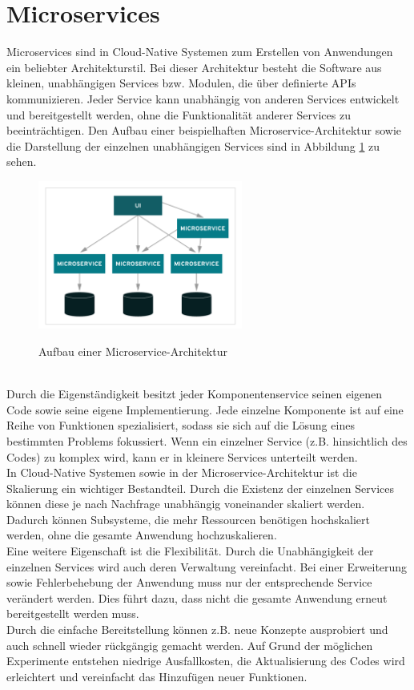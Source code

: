 \section{Microservices}
Microservices sind in Cloud-Native Systemen zum Erstellen von Anwendungen ein beliebter Architekturstil. Bei dieser Architektur besteht die Software aus kleinen, unabhängigen Services bzw. Modulen, die über definierte APIs kommunizieren. Jeder Service kann unabhängig von anderen Services entwickelt und bereitgestellt werden, ohne die Funktionalität anderer Services zu beeinträchtigen. Den Aufbau einer beispielhaften Microservice-Architektur sowie die Darstellung der einzelnen unabhängigen Services sind in Abbildung \ref{micro} zu sehen.\\
\begin{figure}[bth] 
	\centering
	\includegraphics[width=0.6\textwidth]{Graphics/Microservice.png}
	\caption{Aufbau einer Microservice-Architektur}
	\label{micro}
	\cite{microBild}
\end{figure}\\
Durch die Eigenständigkeit besitzt jeder Komponentenservice seinen eigenen Code sowie seine eigene Implementierung. Jede einzelne Komponente ist auf eine Reihe von Funktionen spezialisiert, sodass sie sich auf die Lösung eines bestimmten Problems fokussiert. Wenn ein einzelner Service (z.B. hinsichtlich des Codes) zu komplex wird, kann er in kleinere Services unterteilt werden.\\
In Cloud-Native Systemen sowie in der Microservice-Architektur ist die Skalierung ein wichtiger Bestandteil. Durch die Existenz der einzelnen Services können diese je nach Nachfrage unabhängig voneinander skaliert werden. Dadurch können Subsysteme, die mehr Ressourcen benötigen hochskaliert werden, ohne die gesamte Anwendung hochzuskalieren.\\
Eine weitere Eigenschaft ist die Flexibilität. Durch die Unabhängigkeit der einzelnen Services wird auch deren Verwaltung vereinfacht. Bei einer Erweiterung sowie Fehlerbehebung der Anwendung muss nur der entsprechende Service verändert werden. Dies führt dazu, dass nicht die gesamte Anwendung erneut bereitgestellt werden muss.\\
Durch die einfache Bereitstellung können z.B. neue Konzepte ausprobiert und auch schnell wieder rückgängig gemacht werden. Auf Grund der möglichen Experimente entstehen niedrige Ausfallkosten, die Aktualisierung des Codes wird erleichtert und vereinfacht das Hinzufügen neuer Funktionen.\cite{microservice}
